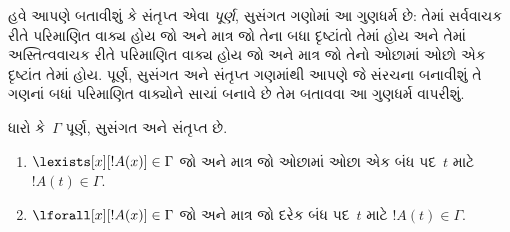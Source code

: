 \begin{explain}
હવે આપણે બતાવીશું કે સંતૃપ્ત એવા \emph{પૂર્ણ}, સુસંગત ગણોમાં આ ગુણધર્મ
છે: તેમાં સર્વવાચક રીતે પરિમાણિત વાક્ય હોય જો
  અને માત્ર જો તેના બધા દૃષ્ટાંતો તેમાં હોય
  અને તેમાં અસ્તિત્વવાચક રીતે પરિમાણિત વાક્ય
  હોય જો અને માત્ર જો તેનો ઓછામાં ઓછો એક દૃષ્ટાંત તેમાં હોય.
પૂર્ણ, સુસંગત અને સંતૃપ્ત ગણમાંથી આપણે જે સંરચના બનાવીશું તે
ગણનાં બધાં પરિમાણિત વાક્યોને સાચાં બનાવે છે તેમ બતાવવા આ ગુણધર્મ
વાપરીશું.
\end{explain}


\begin{prop}
ધારો કે~$\Gamma$ પૂર્ણ, સુસંગત અને સંતૃપ્ત છે.
\begin{enumerate}
\item $\lexists[x][!A(x)] \in \Gamma$ જો અને માત્ર જો ઓછામાં
  ઓછા એક બંધ પદ~$t$ માટે $!A(t) \in \Gamma$.
\item $\lforall[x][!A(x)] \in \Gamma$ જો અને માત્ર જો
  દરેક બંધ પદ~$t$ માટે $!A(t) \in \Gamma$.
\end{enumerate}
\end{prop}


